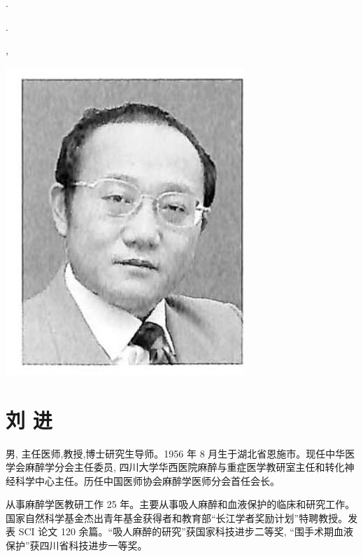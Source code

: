 \documentclass[10pt]{article}
\begin{document}
.

.

,

\begin{center}
\includegraphics[max width=\textwidth]{2024_07_09_002a177993bd97d1d6d7g-014}
\end{center}

\section*{刘 进}
男, 主任医师,教授,博士研究生导师。1956 年 8 月生于湖北省恩施市。现任中华医学会麻醉学分会主任委员, 四川大学华西医院麻醉与重症医学教研室主任和转化神经科学中心主任。历任中国医师协会麻醉学医师分会首任会长。

从事麻醉学医教研工作 25 年。主要从事吸人麻醉和血液保护的临床和研究工作。国家自然科学基金杰出青年基金获得者和教育部“长江学者奖励计划”特聘教授。发表 SCI 论文 120 余篇。“吸人麻醉的研究”获国家科技进步二等奖, “围手术期血液保护”获四川省科技进步一等奖。
\end{document}
